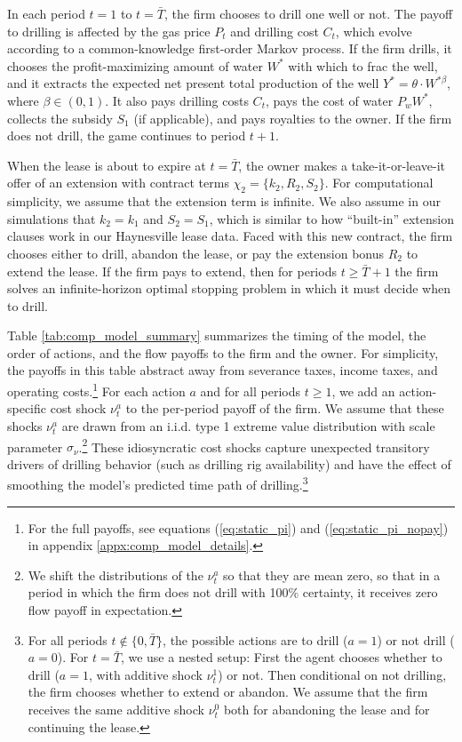 \documentclass[12pt]{article}
\begin{document}
In each period $t=1$ to $t = \bar{T}$, the firm chooses to drill one well or not. The payoff to drilling is affected by the gas price $P_t$ and drilling cost $C_t$, which evolve according to a common-knowledge first-order Markov process. If the firm drills, it chooses the profit-maximizing amount of water $W^*$ with which to frac the well, and it extracts the expected net present total production of the well $Y^* = \theta \cdot W^{*\beta}$, where $\beta\in(0,1)$. It also pays drilling costs $C_t$, pays the cost of water $P_w W^*$, collects the subsidy $S_1$ (if applicable), and pays royalties to the owner. If the firm does not drill, the game continues to period $t+1$.

When the lease is about to expire at $t = \bar{T}$, the owner makes a take-it-or-leave-it offer of an extension with contract terms $\chi_2 = \{ k_2, R_2, S_2 \}$. For computational simplicity, we assume that the extension term is infinite. We also assume in our simulations that $k_2 = k_1$ and $S_2 = S_1$, which is similar to how ``built-in'' extension clauses work in our Haynesville lease data. Faced with this new contract, the firm chooses either to drill, abandon the lease, or pay the extension bonus $R_2$ to extend the lease. If the firm pays to extend, then for periods $t \geq \bar{T} + 1$ the firm solves an infinite-horizon optimal stopping problem in which it must decide when to drill.

Table \ref{tab:comp_model_summary} summarizes the timing of the model, the order of actions, and the flow payoffs to the firm and the owner. For simplicity, the payoffs in this table abstract away from severance taxes, income taxes, and operating costs.\footnote{For the full payoffs, see equations (\ref{eq:static_pi}) and (\ref{eq:static_pi_nopay}) in appendix \ref{appx:comp_model_details}.} For each action $a$ and for all periods $t\geq1$, we add an action-specific cost shock $\nu^a_t$ to the per-period payoff of the firm. We assume that these shocks $\nu^a_t$ are drawn from an i.i.d. type 1 extreme value distribution with scale parameter $\sigma_{\nu}$.\footnote{We shift the distributions of the $\nu^a_t$ so that they are mean zero, so that in a period in which the firm does not drill with 100\% certainty, it receives zero flow payoff in expectation.} These idiosyncratic cost shocks capture unexpected transitory drivers of drilling behavior (such as drilling rig availability) and have the effect of smoothing the model's predicted time path of drilling.\footnote{For all periods $t \notin \{0, \bar{T} \}$, the possible actions are to drill ($a=1$) or not drill ($a =0$). For $t = \bar{T}$, we use a nested setup: First the agent chooses whether to drill ($a=1$, with additive shock $\nu^1_t$) or not. Then conditional on not drilling, the firm chooses whether to extend or abandon. We assume that the firm receives the same additive shock $\nu^0_t$ both for abandoning the lease and for continuing the lease.}
\end{document}
